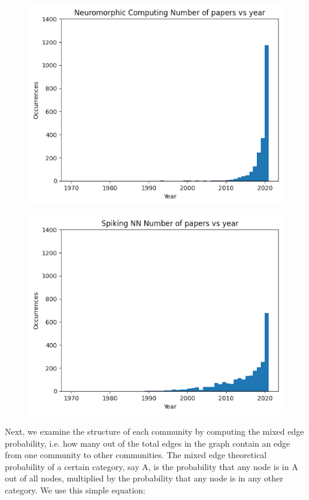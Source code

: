 \documentclass[conference]{IEEEtran}
\begin{document}
\begin{figure}[htbp]
{    \includegraphics[scale=0.25]{neuromorphic_by_year.png}
    }
    \parbox[b]{.45\linewidth}{
    \includegraphics[scale=0.25]{spiking_by_year.png}
    }
\end{figure}

Next, we examine the structure of each community by computing the mixed edge 
probability, i.e. how many out of the total edges in the graph contain an edge 
from one community to other communities. The mixed edge theoretical probability 
of a certain category, say A, is the probability that any node is in A out of 
all nodes, multiplied by the probability that any node is in any other category. 
We use this simple equation: \par
\end{document}
